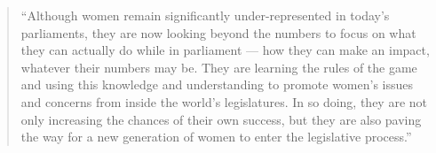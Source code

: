 \documentclass[12pt, 
    twoside=false, 
    bibliography=totoc, 
    numbers=endperiod, 
    headings=normal, 
    toc=chapterentrydotfill
    ]{scrbook}
\begin{document}
\begin{quote}
    \enquote{Although women remain significantly under-represented in today’s parliaments, they are now looking beyond the numbers to focus on what they can actually do while in parliament — how they can make an impact, whatever their numbers may be. They are learning the rules of the game and using this knowledge and understanding to promote women’s issues and concerns from inside the world’s legislatures. In so doing, they are not only increasing the chances of their own success, but they are also paving the way for a new generation of women to enter the legislative process.} \parencite[3]{lovenduski_2015}
\end{quote}

\printbibliography[title={Literaturverzeichnis}]
\end{document}
